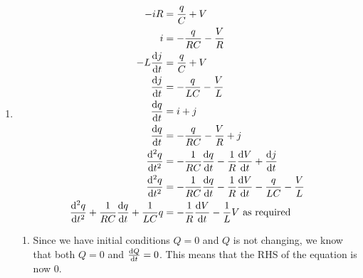 \documentclass[10pt,\jkfside,a4paper]{article}
\begin{document}
\begin{enumerate}
\item
\begin{equation}
\begin{split}
-iR &= \frac{q}{C} + V\\
i &= -\frac{q}{RC} - \frac{V}{R}\\
-L\dv{j}{t} &= \frac{q}{C} + V\\
\dv{j}{t} &= -\frac{q}{LC} - \frac{V}{L}\\
\dv{q}{t} &= i + j\\
\dv{q}{t} &= -\frac{q}{RC} - \frac{V}{R} + j\\
\dv[2]{q}{t} &= -\frac{1}{RC}\dv{q}{t} - \frac{1}{R}\dv{V}{t} + \dv{j}{t}\\
\dv[2]{q}{t} &= -\frac{1}{RC}\dv{q}{t} - \frac{1}{R}\dv{V}{t} - \frac{q}{LC} - \frac{V}{L}\\
\dv[2]{q}{t} + \frac{1}{RC}\dv{q}{t} + \frac{1}{LC}q &= -\frac{1}{R}\dv{V}{t} - \frac{1}{L}V \text{ as required}\\
\end{split}
\end{equation}

\begin{enumerate}

\item 

Since we have initial conditions $Q = 0$ and $Q$ is not changing, we know that both $Q = 0$ and 
$\dv{Q}{t} = 0$. This means that the RHS of the equation is now 0.


\end{enumerate}
\end{enumerate}
\end{document}
